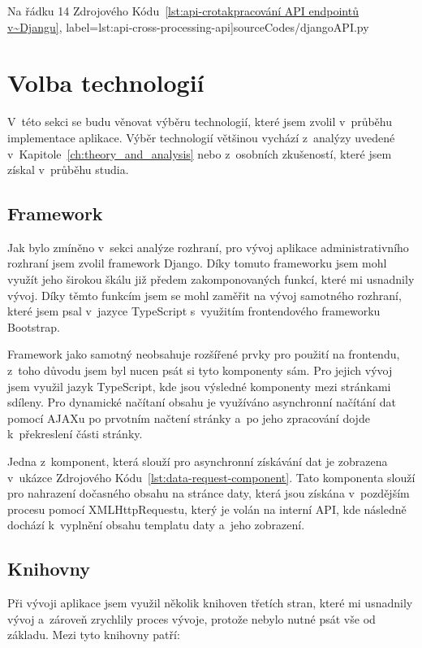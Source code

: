 Na řádku 14 Zdrojového Kódu~\ref{lst:api-crotakpracování API endpointů v~Djangu}, label={lst:api-cross-processing-api}]{sourceCodes/djangoAPI.py}


\section{Volba technologií}
\label{sec:implementation-technologies}
V~této sekci se budu věnovat výběru technologií, které jsem zvolil v~průběhu implementace aplikace. Výběr technologií většinou vychází z~analýzy uvedené v~Kapitole~\ref{ch:theory_and_analysis} nebo z~osobních zkušeností, které jsem získal v~průběhu studia.

\subsection{Framework}
\label{subsec:implementation-technologies-framework}
Jak bylo zmíněno v~sekci analýze rozhraní, pro vývoj aplikace administrativního rozhraní jsem zvolil framework Django. Díky tomuto frameworku jsem mohl využít jeho širokou škálu již předem zakomponovaných funkcí, které mi usnadnily vývoj. Díky těmto funkcím jsem se mohl zaměřit na vývoj samotného rozhraní, které jsem psal v~jazyce TypeScript s~využitím frontendového frameworku Bootstrap.

Framework jako samotný neobsahuje rozšířené prvky pro použití na frontendu, z~toho důvodu jsem byl nucen psát si tyto komponenty sám. Pro jejich vývoj jsem využil jazyk TypeScript, kde jsou výsledné komponenty mezi stránkami sdíleny. Pro dynamické načítaní obsahu je využíváno asynchronní načítání dat pomocí AJAXu po prvotním načtení stránky a~po jeho zpracování dojde k~překreslení části stránky.

Jedna z~komponent, která slouží pro asynchronní získávání dat je zobrazena v~ukázce Zdrojového Kódu~\ref{lst:data-request-component}. Tato komponenta slouží pro nahrazení dočasného obsahu na stránce daty, která jsou získána v~pozdějším procesu pomocí XMLHttpRequestu, který je volán na interní API, kde následně dochází k~vyplnění obsahu templatu daty a~jeho zobrazení.

\pagebreak


\subsection{Knihovny}
\label{subsec:implementation-technologies-libraries}
Při vývoji aplikace jsem využil několik knihoven třetích stran, které mi usnadnily vývoj a~zároveň zrychlily proces vývoje, protože nebylo nutné psát vše od základu. Mezi tyto knihovny patří:

